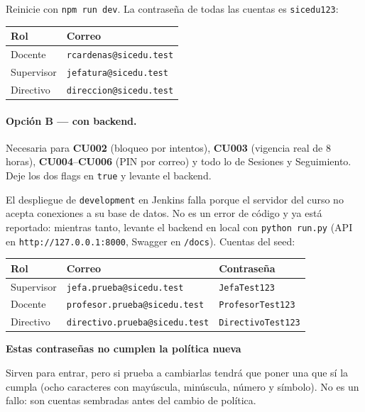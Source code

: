\documentclass[11pt,a4paper]{article}
\newcommand{\cu}[1]{\textbf{CU#1}}
\newenvironment{aviso}[1]
  {\par\medskip\noindent
   \begin{lrbox}{\cajaaviso}
   \begin{minipage}{\dimexpr\textwidth-2\fboxsep-2\fboxrule\relax}
   \smallskip
   \textbf{\textcolor{ambar}{#1}}\par\smallskip}
  {\smallskip\end{minipage}\end{lrbox}%
   \fcolorbox{ambar}{grisclaro}{\usebox{\cajaaviso}}\par\medskip}
\begin{document}
Reinicie con \texttt{npm run dev}. La contraseña de todas las cuentas es
\texttt{sicedu123}:

\begin{center}
\begin{tabular}{ll}
\toprule
\textbf{Rol} & \textbf{Correo} \\
\midrule
Docente    & \texttt{rcardenas@sicedu.test}  \\
Supervisor & \texttt{jefatura@sicedu.test}   \\
Directivo  & \texttt{direccion@sicedu.test}  \\
\bottomrule
\end{tabular}
\end{center}

\paragraph{Opción B --- con backend.} Necesaria para \cu{002} (bloqueo por
intentos), \cu{003} (vigencia real de 8 horas), \cu{004}--\cu{006} (PIN por
correo) y todo lo de Sesiones y Seguimiento. Deje los dos flags en
\texttt{true} y levante el backend.

El despliegue de \texttt{development} en Jenkins falla porque el servidor del
curso no acepta conexiones a su base de datos. No es un error de código y ya
está reportado: mientras tanto, levante el backend en local con
\texttt{python run.py} (API en \texttt{http://127.0.0.1:8000}, Swagger en
\texttt{/docs}). Cuentas del seed:

\begin{center}
\begin{tabular}{lll}
\toprule
\textbf{Rol} & \textbf{Correo} & \textbf{Contraseña} \\
\midrule
Supervisor & \texttt{jefa.prueba@sicedu.test}      & \texttt{JefaTest123}      \\
Docente    & \texttt{profesor.prueba@sicedu.test}  & \texttt{ProfesorTest123}  \\
Directivo  & \texttt{directivo.prueba@sicedu.test} & \texttt{DirectivoTest123} \\
\bottomrule
\end{tabular}
\end{center}

\begin{aviso}{Estas contraseñas no cumplen la política nueva}
Sirven para entrar, pero si prueba a cambiarlas tendrá que poner una que sí la
cumpla (ocho caracteres con mayúscula, minúscula, número y símbolo). No es un
fallo: son cuentas sembradas antes del cambio de política.
\end{aviso}
\end{document}

